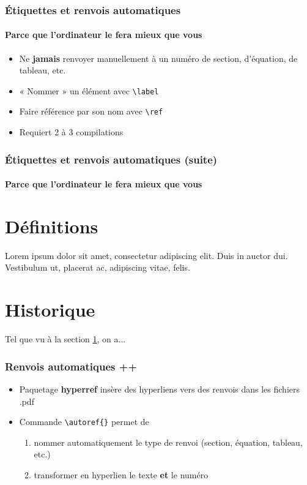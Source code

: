 
\begin{frame}[c,fragile]
	
	\frametitle{Étiquettes et renvois automatiques}
	\framesubtitle{Parce que l'ordinateur le fera mieux que vous}
	
	\begin{itemize}
		\item Ne \textbf{jamais} renvoyer manuellement à un numéro de section,
		d’équation, de tableau, etc.
		\item « Nommer » un élément avec \lstinline|\label|
		\item Faire référence par son nom avec \lstinline|\ref|
		\item Requiert 2 à 3 compilations
	\end{itemize}
\end{frame}


\begin{frame}[c,fragile]

	\frametitle{Étiquettes et renvois automatiques (suite)}
	\framesubtitle{Parce que l'ordinateur le fera mieux que vous}
	
	\begin{codesource}
	\section{Définitions}
	\label{sec:definitions}
	Lorem ipsum dolor sit amet, consectetur
	adipiscing elit. Duis in auctor dui. Vestibulum
	ut, placerat ac, adipiscing vitae, felis.
	\section{Historique}
	Tel que vu à la section \ref{sec:definitions},
	on a...
	\end{codesource}
\end{frame}


\begin{frame}[c,fragile]

	\frametitle{Renvois automatiques ++}
	
	\begin{itemize}
		\item Paquetage \textbf{hyperref} insère des hyperliens vers des renvois dans les fichiers
		.pdf
		\item Commande \lstinline|\autoref{}| permet de
		
			\begin{enumerate}
				\item nommer automatiquement le type de renvoi (section, équation, tableau, etc.)
				\item transformer en hyperlien le texte \textbf{et} le numéro
			\end{enumerate}
	\end{itemize}
\end{frame}